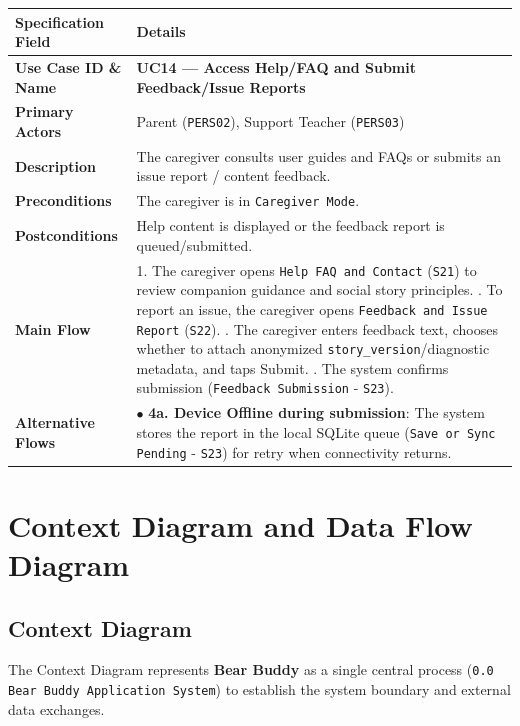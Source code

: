 \noindent\begin{xltabular}{\textwidth}{|p{4.0cm}|X|}
\hline
\textbf{Specification Field} & \textbf{Details} \\ \hline
\endhead
\textbf{Use Case ID \& Name} & \textbf{UC14 — Access Help/FAQ and Submit Feedback/Issue Reports} \\ \hline
\textbf{Primary Actors} & Parent (\texttt{PERS02}), Support Teacher (\texttt{PERS03}) \\ \hline
\textbf{Description} & The caregiver consults user guides and FAQs or submits an issue report / content feedback. \\ \hline
\textbf{Preconditions} & The caregiver is in \texttt{Caregiver Mode}. \\ \hline
\textbf{Postconditions} & Help content is displayed or the feedback report is queued/submitted. \\ \hline
\textbf{Main Flow} & 1. The caregiver opens \texttt{Help FAQ and Contact} (\texttt{S21}) to review companion guidance and social story principles. . To report an issue, the caregiver opens \texttt{Feedback and Issue Report} (\texttt{S22}). . The caregiver enters feedback text, chooses whether to attach anonymized \texttt{story\_version}/diagnostic metadata, and taps Submit. . The system confirms submission (\texttt{Feedback Submission} - \texttt{S23}). \\ \hline
\textbf{Alternative Flows} & $\bullet$ \textbf{4a. Device Offline during submission}: The system stores the report in the local SQLite queue (\texttt{Save or Sync Pending} - \texttt{S23}) for retry when connectivity returns. \\ \hline
\end{xltabular}



\section{Context Diagram and Data Flow Diagram}



\subsection{Context Diagram}


The Context Diagram represents \textbf{Bear Buddy} as a single central process (\texttt{0.0 Bear Buddy Application System}) to establish the system boundary and external data exchanges.


